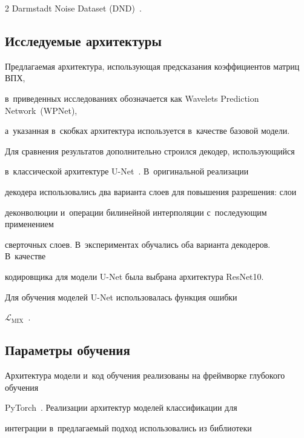 \begin{multicols}{2}
Darmstadt Noise Dataset (DND)~\cite{DNDSet}.








\subsection{Исследуемые архитектуры}





Предлагаемая архитектура, использующая предсказания коэффициентов матриц ВПХ, 


в~приведенных исследованиях обозначается как Wavelets Prediction Network~(WPNet), 


а~указанная в~скобках архитектура используется в~качестве базовой мо\-дели.





Для сравнения результатов дополнительно строился декодер, использующийся 


в~классической архитектуре U-Net~\cite{UNET_ORIGINAL}. В~оригинальной реализации 


декодера использовались два варианта слоев для повышения разрешения: слои 


деконволюции и~операции билинейной интерполяции с~последующим применением 


сверточных слоев. В~экспериментах обучались оба варианта декодеров. В~качестве 


кодировщика для модели U-Net была выбрана архитектура ResNet10.





Для обучения моделей U-Net использовалась функция ошибки 


$\mathcal{L}_{\mathrm{MIX}}$~\cite{MIX_LOSS}.





\subsection{Параметры обучения}





Архитектура модели и~код обучения реализованы на фреймворке глубокого обучения 


PyTorch~\cite{PYTORCH_LIB}. Реализации архитектур моделей классификации для 


интеграции в~предлагаемый подход использовались из библиотеки 



\end{multicols}
